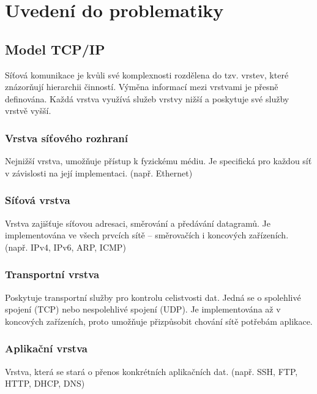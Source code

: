 \documentclass[11pt, a4paper, titlepage]{article}
\begin{document}
\newpage


\section{Uvedení do problematiky}

\subsection{Model TCP/IP}

Síťová komunikace je kvůli své komplexnosti rozdělena do tzv. vrstev, které znázorňují hierarchii činností. Výměna informací mezi vrstvami je přesně definována. Každá vrstva využívá služeb vrstvy nižší a poskytuje své služby vrstvě vyšší.

\subsubsection{Vrstva síťového rozhraní}

Nejnižší vrstva, umožňuje přístup k fyzickému médiu. Je specifická pro každou síť v závislosti na její implementaci. (např. Ethernet)

\subsubsection{Síťová vrstva}

Vrstva zajišťuje síťovou adresaci, směrování a předávání datagramů. Je implementována ve všech prvcích sítě -- směrovačích i koncových zařízeních. (např. IPv4, IPv6, ARP, ICMP)

\subsubsection{Transportní vrstva}

Poskytuje transportní služby pro kontrolu celistvosti dat. Jedná se o spolehlivé spojení (TCP) nebo nespolehlivé spojení (UDP). Je implementována až v koncových zařízeních, proto umožňuje přizpůsobit chování sítě potřebám aplikace.

\subsubsection{Aplikační vrstva}
Vrstva, která se stará o přenos konkrétních aplikačních dat. (např. SSH, FTP, HTTP, DHCP, DNS)
\end{document}
